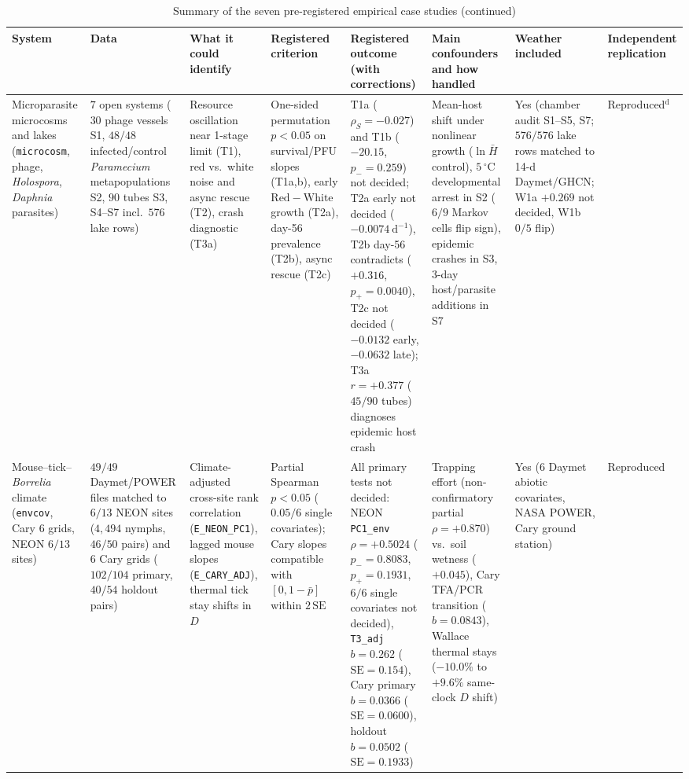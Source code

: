 \begin{table}[p]
\addtocounter{table}{-1}\caption{Summary of the seven pre-registered empirical case studies (continued)}
{\tiny\setlength{\tabcolsep}{2pt}\renewcommand{\arraystretch}{1.12}
\begin{tabular}{@{}p{}p{}p{}p{}p{}p{}p{}p{}@{}}
\toprule
System & Data & What it could identify & Registered criterion & Registered outcome (with corrections) & Main confounders and how handled & Weather included & Independent replication \\
\midrule
Microparasite microcosms and lakes (\texttt{microcosm}, phage, \textit{Holospora}, \textit{Daphnia} parasites) & $7$ open systems ($30$ phage vessels S1, $48/48$ infected/control \textit{Paramecium} metapopulations S2, $90$ tubes S3, S4--S7 incl.\ $576$ lake rows) & Resource oscillation near 1-stage limit (T1), red vs.\ white noise and async rescue (T2), crash diagnostic (T3a) & One-sided permutation $p < 0.05$ on survival/PFU slopes (T1a,b), early $\mathrm{Red} - \mathrm{White}$ growth (T2a), day-56 prevalence (T2b), async rescue (T2c) & T1a ($\rho_S = -0.027$) and T1b ($-20.15$, $p_- = 0.259$) not decided; T2a early not decided ($-0.0074\ \mathrm{d}^{-1}$), T2b day-56 contradicts ($+0.316$, $p_+ = 0.0040$), T2c not decided ($-0.0132$ early, $-0.0632$ late); T3a $r = +0.377$ ($45/90$ tubes) diagnoses epidemic host crash & Mean-host shift under nonlinear growth ($\ln\bar{H}$ control), $5\,^{\circ}\mathrm{C}$ developmental arrest in S2 ($6/9$ Markov cells flip sign), epidemic crashes in S3, 3-day host/parasite additions in S7 & Yes (chamber audit S1--S5, S7; $576/576$ lake rows matched to 14-d Daymet/GHCN; W1a $+0.269$ not decided, W1b $0/5$ flip) & Reproduced$^{\mathrm{d}}$ \\
Mouse--tick--\textit{Borrelia} climate (\texttt{envcov}, Cary 6 grids, NEON $6/13$ sites) & $49/49$ Daymet/POWER files matched to $6/13$ NEON sites ($4{,}494$ nymphs, $46/50$ pairs) and $6$ Cary grids ($102/104$ primary, $40/54$ holdout pairs) & Climate-adjusted cross-site rank correlation (\texttt{E\_NEON\_PC1}), lagged mouse slopes (\texttt{E\_CARY\_ADJ}), thermal tick stay shifts in $D$ & Partial Spearman $p < 0.05$ ($0.05/6$ single covariates); Cary slopes compatible with $[0, 1-\bar{p}]$ within $2\,\mathrm{SE}$ & All primary tests not decided: NEON \texttt{PC1\_env} $\rho = +0.5024$ ($p_- = 0.8083$, $p_+ = 0.1931$, $6/6$ single covariates not decided), \texttt{T3\_adj} $b = 0.262$ ($\mathrm{SE} = 0.154$), Cary primary $b = 0.0366$ ($\mathrm{SE} = 0.0600$), holdout $b = 0.0502$ ($\mathrm{SE} = 0.1933$) & Trapping effort (non-confirmatory partial $\rho = +0.870$) vs.\ soil wetness ($+0.045$), Cary TFA/PCR transition ($b = 0.0843$), Wallace thermal stays ($-10.0\%$ to $+9.6\%$ same-clock $D$ shift) & Yes (6 Daymet abiotic covariates, NASA POWER, Cary ground station) & Reproduced \\

\end{tabular}}
\end{table}

